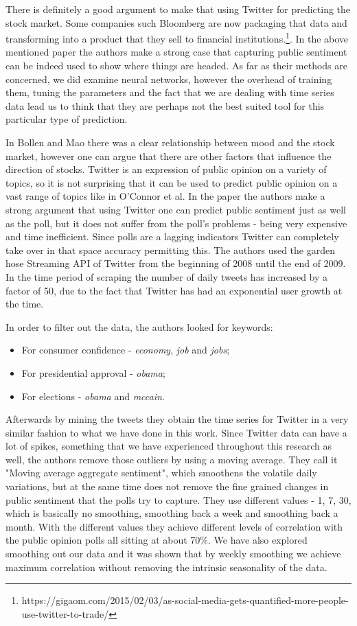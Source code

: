 \documentclass[minf,twoside,singlespacing,parskip,notimes,deptreport]{infthesis} %
\begin{document}
There is definitely a good argument to make that using Twitter for predicting the stock market. 
Some companies such Bloomberg are now packaging that data and transforming into a product that they sell to financial institutions.\footnote{https://gigaom.com/2015/02/03/as-social-media-gets-quantified-more-people-use-twitter-to-trade/}. 
In the above mentioned paper the authors make a strong case that capturing public sentiment can be indeed used to show where things are headed. 
As far as their methods are concerned, we did examine neural networks, however the overhead of training them, tuning the parameters and the fact that we are dealing with time series data lead us to think that they are perhaps not the best suited tool for this particular type of prediction. 

In Bollen and Mao\cite{twitstock} there was a clear relationship between mood and the stock market, however one can argue that there are other factors that influence the direction of stocks. 
Twitter is an expression of public opinion on a variety of topics, so it is not surprising that it can be used to predict public opinion on a vast range of topics like in O'Connor et al\cite{twitpoll}. 
In the paper the authors make a strong argument that using Twitter one can predict public sentiment just as well as the poll, but it does not suffer from the poll's problems - being very expensive and time inefficient. 
Since polls are a lagging indicators Twitter can completely take over in that space accuracy permitting this.
The authors used the garden hose Streaming API of Twitter from the beginning of 2008 until the end of 2009. 
In the time period of scraping the number of daily tweets has increased by a factor of 50, due to the fact that Twitter has had an exponential user growth at the time.

In order to filter out the data, the authors looked for keywords:
\begin{itemize}	
\item For consumer confidence - \textit{economy}, \textit{job} and \textit{jobs};
\item For presidential approval - \textit{obama};
\item For elections - \textit{obama} and \textit{mccain}.
\end{itemize}

Afterwards by mining the tweets they obtain the time series for Twitter in a very similar fashion to what we have done in this work. 
Since Twitter data can have a lot of spikes, something that we have experienced throughout this research as well, the authors remove those outliers by using a moving average. 
They call it "Moving average aggregate sentiment", which smoothens the volatile daily variations, but at the same time does not remove the fine grained changes in public sentiment that the polls try to capture. 
They use different values - 1, 7, 30, which is basically no smoothing, smoothing back a week and smoothing back a month. 
With the different values they achieve different levels of correlation with the public opinion polls all sitting at about 70\%. 
We have also explored smoothing out our data and it was shown that by weekly smoothing we achieve maximum correlation without removing the intrinsic seasonality of the data.
\end{document}
